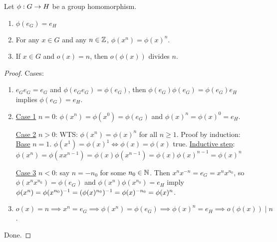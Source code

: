 \documentclass[]{article}
\begin{document}
\begin{theorem}
	Let $\phi :G\rightarrow H$ be a group homomorphism.
	\begin{enumerate}
		\item $\phi(e_G) = e_H$
		\item For any $x\in G$ and any $n\in\mathbb{Z}$, $\phi(x^n) = \phi(x)^n$.
		\item If $x\in G$ and $o(x) = n$, then $o(\phi(x))$ divides $n$.
	\end{enumerate}
\end{theorem}
\begin{proof}
	Cases:
	\begin{enumerate}
		\item $e_G e_G = e_G$ and $\phi(e_G e_G) = \phi(e_G)$, then $\phi(e_G)\phi(e_G) = \phi(e_G) e_H$ implies $\phi(e_G) = e_H$.
		\item \ul{Case 1} $n=0$: $\phi(x^n) = \phi(x^0) = \phi(e_G)$ and $\phi(x)^n = \phi(x)^0 = e_H$.

			\ul{Case 2} $n>0$: WTS: $\phi(x^n) = \phi(x)^n$ for all $n\geq 1$.
			Proof by induction: \ul{Base} $n=1$. $\phi(x^1) = \phi(x)^1 \iff \phi(x) = \phi(x)$ true.
			\ul{Inductive step}: $\phi(x^n) = \phi(xx^{n-1}) = \phi(x)\phi(x^{n-1}) = \phi(x)\phi(x)^{n-1} = \phi(x)^n$

			\ul{Case 3} $n<0$: say $n=-n_0$ for some $n_0\in\mathbb{N}$. Then $x^n x^{-n} = e_G = x^n x^{n_0}$, so $\phi(x^nx^{n_0}) = \phi(e_G)$ and $\phi(x^n)\phi(x^{n_0}) = e_H$ imply $\phi(x^n) = \phi(x^{n_0})^{-1} = (\phi(x)^{n_0})^{-1} = \phi(x)^{-n_0} = \phi(x)^n$.
		\item $o(x) = n \implies x^n = e_G \implies \phi(x^n) = \phi(e_G) \implies \phi(x)^n = e_H \implies o(\phi(x))\mid n$.
	\end{enumerate}
	Done.
\end{proof}
\end{document}
